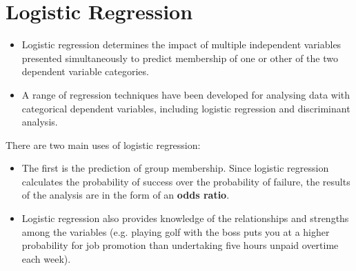 \documentclass[a4paper,12pt]{article}
\begin{document}


\section*{Logistic Regression}
\begin{itemize}
	\item Logistic regression determines the impact of multiple independent variables
	presented simultaneously to predict membership of one or other of the two
	dependent variable categories.
	\item 
	A range of regression techniques have been developed for analysing data with categorical dependent
	variables, including logistic regression and discriminant analysis.
\end{itemize}




There are two main uses of logistic regression:
\begin{itemize}
	\item The first is the prediction of group membership. Since logistic regression calculates the
	probability of success over the probability of failure, the results of the analysis are in
	the form of an \textbf{odds ratio}.
	\item Logistic regression also provides knowledge of the relationships and strengths among
	the variables (e.g. playing golf with the boss puts you at a higher probability for job
	promotion than undertaking five hours unpaid overtime each week).
\end{itemize}
\end{document}
